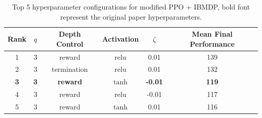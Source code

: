     \begin{table}
        \centering
        \caption{Top 5 hyperparameter configurations for modified PPO + IBMDP, bold font represent the original paper hyperparameters.}\label{tab:mod-ppo}
        \label{tab:top5_ppo_results}
        \begin{tabular}{cccccc}
        \toprule
        Rank & $q$ & Depth Control & Activation & $\zeta$ & {Mean Final Performance} \\
        \midrule
        1 & 3 & reward & $\operatorname{relu}$ & 0.01 & 139 \\
        2 & 3 & termination & $\operatorname{relu}$ & 0.01 & 132 \\
        \textbf{3} & \textbf{3} & \textbf{reward} & $\operatorname{tanh}$ & \textbf{-0.01} & \textbf{119} \\
        4 & 3 & reward & $\operatorname{relu}$ & -0.01 & 117 \\
        5 & 3 & reward & $\operatorname{tanh}$ & 0.01 & 116 \\
        \bottomrule
        \end{tabular}
        \end{table}


